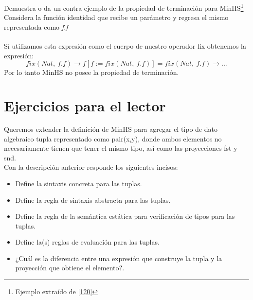         \begin{exercise}
            Demuestra o da un contra ejemplo de la propiedad de terminación para \textsf{MinHS}\footnote{Ejemplo extraído de \hyperlink{120}{[120]}}\\

            Considera la función identidad que recibe un parámetro y regresa el mismo representada como \textit{f.f} \\\\
	 Sí utilizamos esta expresión como el cuerpo de nuestro operador \textsf{fix} obtenemos la expresión:
            \[
                \textit{fix}(Nat,\ f.f) \to f[f:=fix(Nat,\ f.f)] = fix(Nat,\ f.f)  \to ...
            \]
            Por lo tanto \textsf{MinHS} no posee la propiedad de terminación.
        \end{exercise}


\section{Ejercicios para el lector}

    \begin{exercise}
        Queremos extender la definición de \textsf{MinHS} para agregar el tipo de dato algebraico tupla representado como \textsf{pair(x,y)}, donde ambos elementos no necesariamente tienen que tener el mismo tipo, así como las proyecciones \textsf{fst} y \textsf{snd}.\\

        Con  la descripción anterior responde los siguientes incisos:\\
        \begin{itemize}
            \item Define la sintaxis concreta para las tuplas.
            \item Define la regla de sintaxis abstracta para las tuplas.
            \item Define la regla de la semántica estática para verificación de tipos para las tuplas.
            \item Define la(s) reglas de evaluación para las tuplas.
            \item ¿Cuál es la diferencia entre una expresión que construye la tupla y la proyección que obtiene el elemento?.
        \end{itemize}
    \end{exercise}

\bigskip

